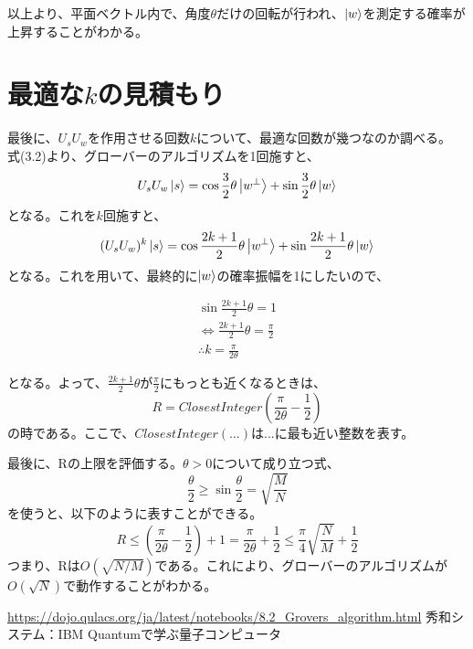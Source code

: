 \documentclass[platex,dvipdfmx]{jlreq}			%
\begin{document}
以上より、平面ベクトル内で、角度$\theta$だけの回転が行われ、$\ket{w}$を測定する確率が上昇することがわかる。


\section{最適な$k$の見積もり}
最後に、$U_sU_w$を作用させる回数$k$について、最適な回数が幾つなのか調べる。
式(3.2)より、グローバーのアルゴリズムを1回施すと、
\begin{equation}
    U_sU_w\ket{s} = \cos{\frac{3}{2}\theta}\ket{w^{\perp}} + \sin{\frac{3}{2}\theta}\ket{w}
\end{equation}
となる。これを$k$回施すと、
\begin{equation}
    (U_sU_w)^k\ket{s} = \cos{\frac{2k+1}{2}\theta} \ket{w^{\perp}} + \sin{\frac{2k+1}{2}\theta} \ket{w}
\end{equation}
となる。これを用いて、最終的に$\ket{w}$の確率振幅を1にしたいので、

\begin{equation}
    \begin{aligned}
    \sin{\frac{2k + 1}{2} \theta} = 1\\
    \Leftrightarrow \frac{2k + 1}{2} \theta = \frac{\pi}{2}\\
    \therefore k = \frac{\pi}{2 \theta}
    \end{aligned}
\end{equation}

となる。よって、$\frac{2k + 1}{2}\theta$が$\frac{\pi}{2}$にもっとも近くなるときは、
\begin{equation}
    R = ClosestInteger(\frac{\pi}{2\theta} - \frac{1}{2})
\end{equation}
の時である。ここで、$ClosestInteger(...)$は$...$に最も近い整数を表す。

最後に、Rの上限を評価する。$\theta > 0$について成り立つ式、
\begin{equation}
    \frac{\theta}{2} \geq \sin{\frac{\theta}{2}} = \sqrt{\frac{M}{N}}
\end{equation}
を使うと、以下のように表すことができる。
\begin{equation}
    R \leq \left( \frac{\pi}{2\theta} - \frac{1}{2} \right) + 1 = \frac{\pi}{2\theta} + \frac{1}{2} \leq \frac{\pi}{4}\sqrt{\frac{N}{M}} + \frac{1}{2}
\end{equation}
つまり、Rは$O(\sqrt{N/M})$である。これにより、グローバーのアルゴリズムが$O(\sqrt{N})$で動作することがわかる。



 \begin{thebibliography}{2}
 \url{https://dojo.qulacs.org/ja/latest/notebooks/8.2_Grovers_algorithm.html}
 秀和システム：IBM Quantumで学ぶ量子コンピュータ
 \end{thebibliography}
\end{document}
